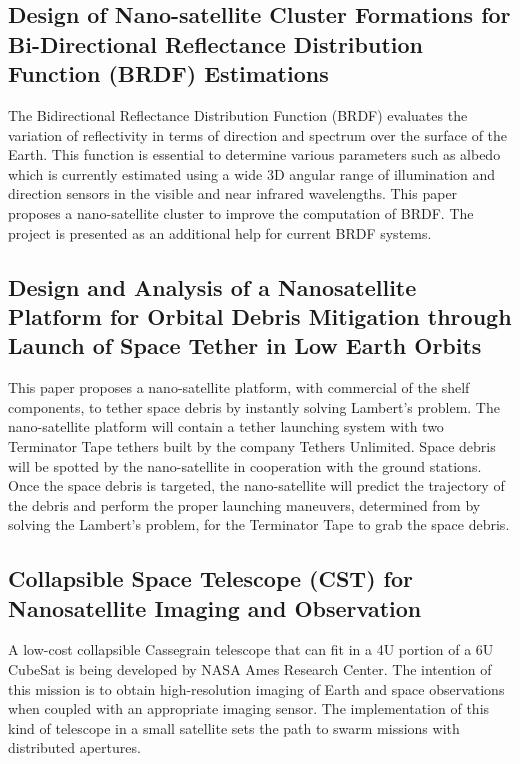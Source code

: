 \subsection{Design of Nano-satellite Cluster Formations for Bi-Directional Reflectance Distribution Function (BRDF) Estimations}
\label{brdf}

The Bidirectional Reflectance Distribution Function (BRDF) evaluates the variation of reflectivity in terms of direction and spectrum over the surface of the Earth. This function is essential to determine various parameters such as albedo which is currently estimated using a wide 3D angular range of illumination and direction sensors in the visible and near infrared wavelengths. This paper proposes a nano-satellite cluster to improve the computation of BRDF. The project is presented as an additional help for current BRDF systems.\cite{Nag_BRDF}

\subsection{Design and Analysis of a Nanosatellite Platform for Orbital Debris Mitigation through Launch of Space Tether in Low Earth Orbits}
\label{debris_mitigation}
This paper proposes a nano-satellite platform, with commercial of the shelf components, to tether space debris by instantly solving Lambert's problem. The nano-satellite platform will contain a tether launching system with two Terminator Tape tethers built by the company Tethers Unlimited. Space debris will be spotted by the nano-satellite in cooperation with the ground stations. Once the space debris is targeted, the nano-satellite will predict the trajectory of the debris and perform the proper launching maneuvers, determined from by solving the Lambert's problem, for the Terminator Tape to grab the space debris.\cite{Asundi_SpaceDebris} 

\subsection{Collapsible Space Telescope (CST) for Nanosatellite Imaging and Observation}
\label{cst}

A low-cost collapsible Cassegrain telescope that can fit in a 4U portion of a 6U CubeSat is being developed by NASA Ames Research Center. The intention of this mission is to obtain high-resolution imaging of Earth and space observations when coupled with an appropriate imaging sensor. The implementation of this kind of telescope in a small satellite sets the path to swarm missions with distributed apertures.\cite{Elwood_CollapsibleTelescope}

